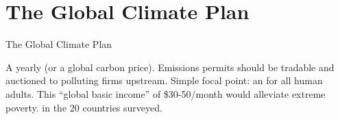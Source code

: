 \documentclass[aspectratio=169,xcolor=dvipsnames, 11pt,mathserif]{beamer}
\begin{document}
\section{The Global Climate Plan}

\begin{frame}{The Global Climate Plan}
    \begin{figure}
        \centering 
    \end{figure}   
    \bbsp \ip {}
    \ip \quad A yearly  \pause (or a global carbon price).
    \ip Emissions permits should be tradable and auctioned to polluting firms upstream.
    \ip {}
    \ip \quad Simple focal point: an  for all human adults.
    \ip \quad This ``global basic income'' of \$30-50/month would alleviate extreme poverty. 
    \ip {}   in the 20 countries surveyed.
    \ee    
\end{frame}
\end{document}
